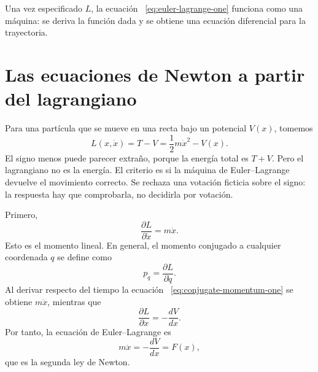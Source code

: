 Una vez especificado \(L\), la ecuación ~\eqref{eq:euler-lagrange-one} funciona como una máquina: se deriva la función dada y se obtiene una ecuación diferencial para la trayectoria.

\begin{classroomqa}\end{classroomqa}

\section{Las ecuaciones de Newton a partir del lagrangiano}

Para una partícula que se mueve en una recta bajo un potencial \(V(x)\), tomemos\begin{equation}
  L(x,\dot x)=T-V
  =\frac12m\dot x^2-V(x).
  \label{eq:lagrangian-tv-one}
\end{equation}El signo menos puede parecer extraño, porque la energía total es \(T+V\). Pero el lagrangiano no es la energía. El criterio es si la máquina de Euler--Lagrange devuelve el movimiento correcto. Se rechaza una votación ficticia sobre el signo: la respuesta hay que comprobarla, no decidirla por votación.

Primero,\begin{equation}
  \frac{\partial L}{\partial\dot x}=m\dot x.
  \label{eq:conjugate-momentum-one}
\end{equation}Esto es el momento lineal. En general, el momento conjugado a cualquier coordenada \(q\) se define como\begin{equation}
  p_q=\frac{\partial L}{\partial\dot q}.
  \label{eq:conjugate-momentum-general}
\end{equation}Al derivar respecto del tiempo la ecuación ~\eqref{eq:conjugate-momentum-one} se obtiene \(m\ddot x\), mientras que\begin{equation}
  \frac{\partial L}{\partial x}
  =-\frac{dV}{dx}.
  \label{eq:lagrangian-position-derivative}
\end{equation}Por tanto, la ecuación de Euler--Lagrange es\begin{equation}
  m\ddot x=-\frac{dV}{dx}=F(x),
  \label{eq:newton-from-action}
\end{equation}que es la segunda ley de Newton.

